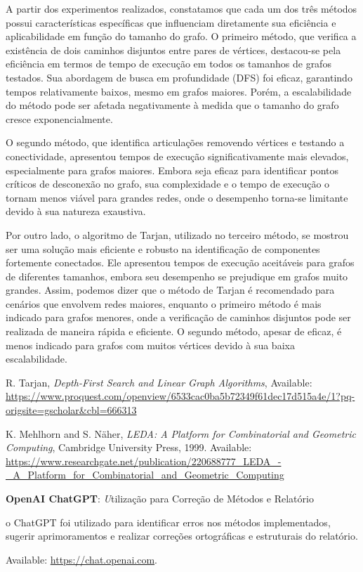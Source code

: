 \vspace{0.5cm}
A partir dos experimentos realizados, constatamos que cada um dos três métodos possui características específicas que influenciam diretamente sua eficiência e aplicabilidade em função do tamanho do grafo. O primeiro método, que verifica a existência de dois caminhos disjuntos entre pares de vértices, destacou-se pela eficiência em termos de tempo de execução em todos os tamanhos de grafos testados. Sua abordagem de busca em profundidade (DFS) foi eficaz, garantindo tempos relativamente baixos, mesmo em grafos maiores. Porém, a escalabilidade do método pode ser afetada negativamente à medida que o tamanho do grafo cresce exponencialmente.

O segundo método, que identifica articulações removendo vértices e testando a conectividade, apresentou tempos de execução significativamente mais elevados, especialmente para grafos maiores. Embora seja eficaz para identificar pontos críticos de desconexão no grafo, sua complexidade e o tempo de execução o tornam menos viável para grandes redes, onde o desempenho torna-se limitante devido à sua natureza exaustiva.

Por outro lado, o algoritmo de Tarjan, utilizado no terceiro método, se mostrou ser uma solução mais eficiente e robusto na identificação de componentes fortemente conectados. Ele apresentou tempos de execução aceitáveis para grafos de diferentes tamanhos, embora seu desempenho se prejudique em grafos muito grandes. Assim, podemos dizer que o método de Tarjan é recomendado para cenários que envolvem redes maiores, enquanto o primeiro método é mais indicado para grafos menores, onde a verificação de caminhos disjuntos pode ser realizada de maneira rápida e eficiente. O segundo método, apesar de eficaz, é menos indicado para grafos com muitos vértices devido à sua baixa escalabilidade.




\begin{thebibliography}{1}
R. Tarjan,
\textit{Depth-First Search and Linear Graph Algorithms},
Available: \url{https://www.proquest.com/openview/6533cac0ba5b72349f61dec17d515a4e/1?pq-origsite=gscholar&cbl=666313}

K. Mehlhorn and S. Näher,
\textit{LEDA: A Platform for Combinatorial and Geometric Computing},
Cambridge University Press, 1999.
Available: \url{https://www.researchgate.net/publication/220688777_LEDA_-_A_Platform_for_Combinatorial_and_Geometric_Computing}

\textbf{OpenAI ChatGPT}:
\textit
Utilização para Correção de Métodos e Relatório
\par
o ChatGPT foi utilizado para identificar erros nos métodos implementados, sugerir aprimoramentos e realizar correções ortográficas e estruturais do relatório. 
\par
Available: \url{https://chat.openai.com}.
\end{thebibliography}

